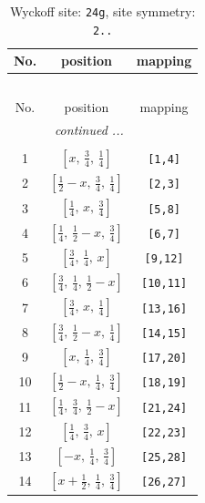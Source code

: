 \documentclass[fleqn,8pt]{jsarticle}
\begin{document}
\renewcommand{\arraystretch}{1.2}
\begin{longtable}{ccc}
\caption{Wyckoff site: {\tt 24g}, site symmetry: {\tt 2..}}
 \\
 \hline \hline
No. & position & mapping \\ \hline \endfirsthead

\multicolumn{2}{l}{\tablename\ \thetable{}} \\
 \hline \hline
No. & position & mapping \\ \hline \endhead

 \hline \hline
\multicolumn{2}{r}{\footnotesize\it continued ...} \\ \endfoot

 \hline \hline
\multicolumn{2}{r}{} \\ \endlastfoot

1 & $\left[ x,\, \frac{3}{4},\, \frac{1}{4} \right]$ & {\tt [1,4]} \\ \hline
2 & $\left[ \frac{1}{2} - x,\, \frac{3}{4},\, \frac{1}{4} \right]$ & {\tt [2,3]} \\ \hline
3 & $\left[ \frac{1}{4},\, x,\, \frac{3}{4} \right]$ & {\tt [5,8]} \\ \hline
4 & $\left[ \frac{1}{4},\, \frac{1}{2} - x,\, \frac{3}{4} \right]$ & {\tt [6,7]} \\ \hline
5 & $\left[ \frac{3}{4},\, \frac{1}{4},\, x \right]$ & {\tt [9,12]} \\ \hline
6 & $\left[ \frac{3}{4},\, \frac{1}{4},\, \frac{1}{2} - x \right]$ & {\tt [10,11]} \\ \hline
7 & $\left[ \frac{3}{4},\, x,\, \frac{1}{4} \right]$ & {\tt [13,16]} \\ \hline
8 & $\left[ \frac{3}{4},\, \frac{1}{2} - x,\, \frac{1}{4} \right]$ & {\tt [14,15]} \\ \hline
9 & $\left[ x,\, \frac{1}{4},\, \frac{3}{4} \right]$ & {\tt [17,20]} \\ \hline
10 & $\left[ \frac{1}{2} - x,\, \frac{1}{4},\, \frac{3}{4} \right]$ & {\tt [18,19]} \\ \hline
11 & $\left[ \frac{1}{4},\, \frac{3}{4},\, \frac{1}{2} - x \right]$ & {\tt [21,24]} \\ \hline
12 & $\left[ \frac{1}{4},\, \frac{3}{4},\, x \right]$ & {\tt [22,23]} \\ \hline
13 & $\left[ - x,\, \frac{1}{4},\, \frac{3}{4} \right]$ & {\tt [25,28]} \\ \hline
14 & $\left[ x + \frac{1}{2},\, \frac{1}{4},\, \frac{3}{4} \right]$ & {\tt [26,27]} \\ \hline

\end{longtable}
\end{document}
